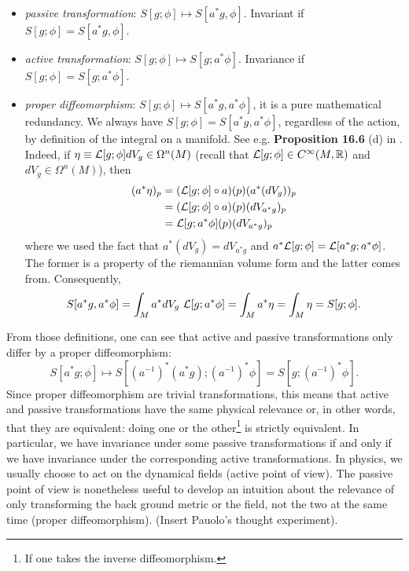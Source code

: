 \documentclass[a4paper,10pt]{article}
\begin{document}
    \begin{itemize}
        \item \emph{passive transformation}: $S[g;\phi]\mapsto S[a^*g,\phi]$. Invariant if $S[g;\phi]=S[a^*g,\phi]$.
        \item \emph{active transformation}: $S[g;\phi]\mapsto S[g;a^*\phi]$. Invariance if $S[g;\phi]= S[g;a^*\phi]$.
        \item \emph{proper diffeomorphism}: $S[g;\phi]\mapsto S[a^*g,a^*\phi]$, it is a pure mathematical redundancy. We always have $S[g;\phi]=S[a^*g,a^*\phi]$, regardless of the action, by definition of the integral on a manifold. See e.g. \textbf{Proposition 16.6} (d) in \cite{Lee_2012}. Indeed, if $\eta\equiv\mathcal{L}[g;\phi]dV_g\in\Omega^n(M)$ (recall that $\mathcal{L}[g;\phi]\in C^\infty(M,\mathbb{R})$ and $dV_g\in\Omega^n(M)$), then
        \begin{align}
            (a^*\eta)_p&=(\mathcal{L}[g;\phi]\circ a)(p)(a^*(dV_g))_p\\
            &= (\mathcal{L}[g;\phi]\circ a)(p)(dV_{a^*g})_p\\
            &= \mathcal{L}[g;a^*\phi](p)(dV_{a^*g})_p
        \end{align}
        where we used the fact that $a^*(dV_g)=dV_{a^*g}$ and $a^*\mathcal{L}[g;\phi]=\mathcal{L}[a^*g;a^*\phi]$. The former is a property of the riemannian volume form and the latter comes from. Consequently,
        \begin{equation}
            S[a^*g,a^*\phi] = \int_M a^*dV_g~\mathcal{L}[g;a^*\phi] = \int_M a^*\eta = \int_M \eta = S[g;\phi].
        \end{equation}
    \end{itemize}
    From those definitions, one can see that active and passive transformations only differ by a proper diffeomorphism:
    \begin{equation}
        S[a^*g;\phi]\mapsto S[(a^{-1})^*(a^*g);(a^{-1})^*\phi]=S[g;(a^{-1})^*\phi].
    \end{equation}
    Since proper diffeomorphism are trivial transformations, this means that active and passive transformations have the same physical relevance or, in other words, that they are equivalent: doing one or the other\footnote{If one takes the inverse diffeomorphism.} is strictly equivalent. In particular, we have invariance under some passive transformations if and only if we have invariance under the corresponding active transformations. In physics, we usually choose to act on the dynamical fields (active point of view). The passive point of view is nonetheless useful to develop an intuition about the relevance of only transforming the back ground metric or the field, not the two at the same time (proper diffeomorphism). (Insert Pauolo's thought experiment).
    
\end{document}

